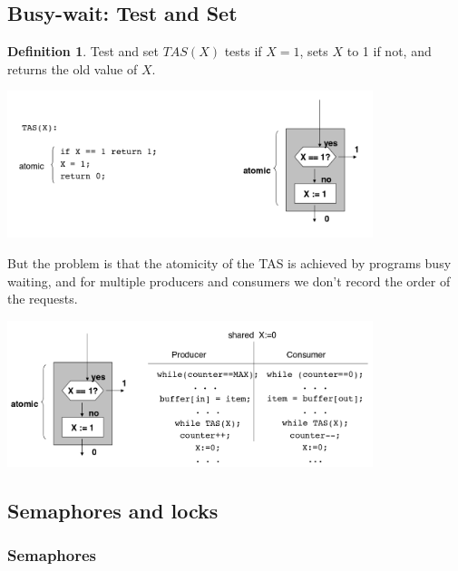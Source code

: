 \documentclass{article}
\theoremstyle{definition}
\newtheorem{definition}{Definition}[section]
\begin{document}
\subsection{Busy-wait: Test and Set}

\begin{definition}{Test and set}
$TAS(X)$ tests if $X = 1$, sets $X$ to 1 if not, and returns the old value of $X$.
\begin{center}
	\includegraphics[width=0.8\textwidth]{TAS}
\end{center}
\end{definition}

But the problem is that the atomicity of the TAS is achieved by programs busy waiting, and for multiple producers and consumers we don't record the order of the requests.

\begin{center}
	\includegraphics[width=0.8\textwidth]{TAS_busy_wait}
\end{center}

\subsection{Semaphores and locks}
\subsubsection{Semaphores}
\end{document}

